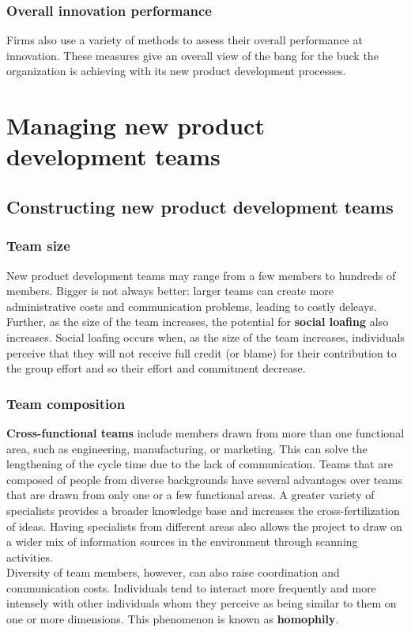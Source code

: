 \documentclass[12pt]{article}
\begin{document}
\subsubsection{Overall innovation performance}
Firms also use a variety of methods to assess their overall performance at innovation.
These measures give an overall view of the bang for the buck the organization is achieving with its new product development processes.

\section{Managing new product development teams}
\subsection{Constructing new product development teams}
\subsubsection{Team size}
New product development teams may range from a few members to hundreds of members.
Bigger is not always better: larger teams can create more administrative costs and communication problems, leading to costly deleays.
Further, as the size of the team increases, the potential for \textbf{social loafing} also
increases. Social loafing occurs when, as the size of the team increases, individuals
perceive that they will not receive full credit (or blame) for their contribution to the
group effort and so their effort and commitment decrease.

\subsubsection{Team composition}
\textbf{Cross-functional teams} include members drawn from more than one functional area, such as engineering, manufacturing, or marketing. This can solve the lengthening of the cycle time due to the lack of communication. 
Teams that are composed of people from diverse backgrounds have several advantages over teams that are drawn from only one or a few functional areas. A greater variety of specialists provides a broader knowledge base and increases the cross-fertilization
of ideas. Having specialists from different areas also allows the project to draw on
a wider mix of information sources in the environment through scanning activities. \\
Diversity of team members, however, can also raise coordination and communication costs. Individuals tend to interact more frequently and more intensely with other
individuals whom they perceive as being similar to them on one or more dimensions.
This phenomenon is known as \textbf{homophily}.
\end{document}
